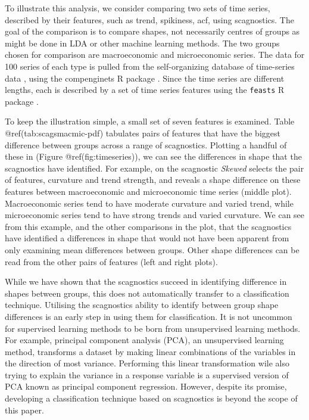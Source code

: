 To illustrate this analysis, we consider comparing two sets of time
series, described by their features, such as trend, spikiness, acf,
using scagnostics. The goal of the comparison is to compare shapes, not
necessarily centres of groups as might be done in LDA or other machine
learning methods. The two groups chosen for comparison are macroeconomic
and microeconomic series. The data for 100 series of each type is pulled
from the self-organizing database of time-series data \citep{sots},
using the compenginets R package \citep{compenginets}. Since the time
series are different lengths, each is described by a set of time series
features \citep[chapter 4 of][]{fpp} using the \texttt{feasts} R package
\citep{feasts}.

To keep the illustration simple, a small set of seven features is
examined. Table @ref(tab:scagsmacmic-pdf) tabulates pairs of features
that have the biggest difference between groups across a range of
scagnostics. Plotting a handful of these in (Figure
@ref(fig:timeseries)), we can see the differences in shape that the
scagnostics have identified. For example, on the scagnostic
\emph{Skewed} selects the pair of features, curvature and trend
strength, and reveals a shape difference on these features between
macroeconomic and microeconomic time series (middle plot). Macroeconomic
series tend to have moderate curvature and varied trend, while
microeconomic series tend to have strong trends and varied curvature. We
can see from this example, and the other comparisons in the plot, that
the scagnostics have identified a differences in shape that would not
have been apparent from only examining mean differences between groups.
Other shape differences can be read from the other pairs of features
(left and right plots).

While we have shown that the scagnostics succeed in identifying
difference in shapes between groups, this does not automatically
transfer to a classification technique. Utilising the scagnostics
ability to identify between group shape differences is an early step in
using them for classification. It is not uncommon for supervised
learning methods to be born from unsupervised learning methods. For
example, principal component analysis (PCA), an unsupervised learning
method, transforms a dataset by making linear combinations of the
variables in the direction of most variance. Performing this linear
transformation wile also trying to explain the variance in a response
variable is a supervised version of PCA known as principal component
regression. However, despite its promise, developing a classification
technique based on scagnostics is beyond the scope of this paper.

